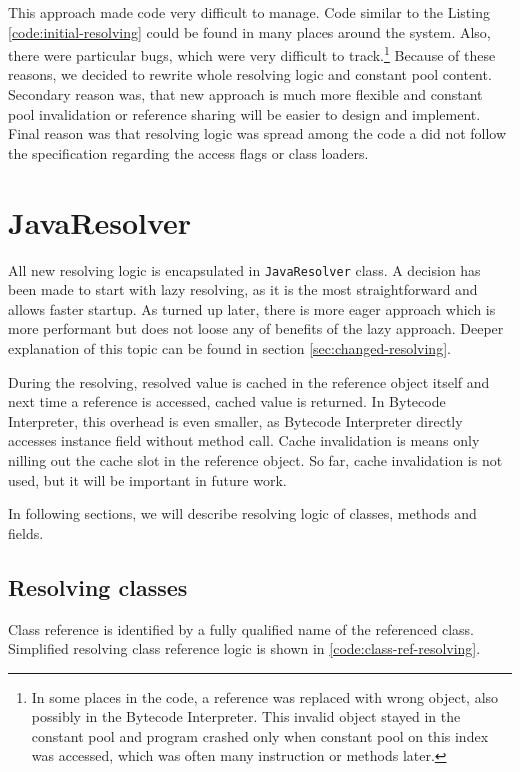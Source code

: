 \documentclass[11pt,twoside,a4paper]{book}
\begin{document}
This approach made code very difficult to manage.
Code similar to the Listing \ref{code:initial-resolving} could be found in many places around the system.
Also, there were particular bugs, which were very difficult to track.\footnote{In some places in the code, a reference was replaced with wrong object, also possibly in the Bytecode Interpreter. This invalid object stayed in the constant pool and program crashed only when constant pool on this index was accessed, which was often many instruction or methods later.}
Because of these reasons, we decided to rewrite whole resolving logic and constant pool content.
Secondary reason was, that new approach is much more flexible and constant pool invalidation or reference sharing will be easier to design and implement.
Final reason was that resolving logic was spread among the code a did not follow the specification regarding the access flags or class loaders.

\section{JavaResolver}

All new resolving logic is encapsulated in \texttt{JavaResolver} class. 
A decision has been made to start with lazy resolving, as it is the most straightforward and allows faster startup.
As turned up later, there is more eager approach which is more performant but does not loose any of benefits of the lazy approach.
Deeper explanation of this topic can be found in section \ref{sec:changed-resolving}.

During the resolving, resolved value is cached in the reference object itself and next time a reference is accessed, cached value is returned.
In Bytecode Interpreter, this overhead is even smaller, as Bytecode Interpreter directly accesses instance field without method call.
Cache invalidation is means only nilling out the cache slot in the reference object.
So far, cache invalidation is not used, but it will be important in future work.

In following sections, we will describe resolving logic of classes, methods and fields.

\subsection{Resolving classes}
\label{sec:resolving_classes}

Class reference is identified by a fully qualified name of the referenced class. Simplified resolving class reference logic is shown in \ref{code:class-ref-resolving}.
\end{document}
